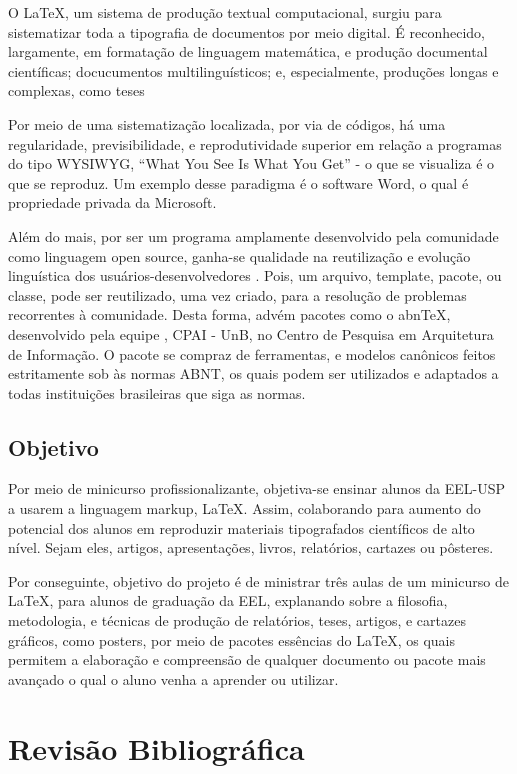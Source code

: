 \documentclass[
12pt,				%
openright,			%
oneside,			%
a4paper,			%
english,			%
french,				%
spanish,			%
brazil,				%
]{abntex2}
\begin{document}
O \LaTeX, um sistema de produção textual computacional, surgiu para
sistematizar toda a tipografia de documentos por meio digital. É
reconhecido, largamente, em formatação de linguagem matemática, e
produção documental científicas; docucumentos multilinguísticos; e,
especialmente, produções longas e complexas, como teses
\cite{ignat2005}

Por meio de uma sistematização localizada, por via de códigos, há uma
regularidade, previsibilidade, e reprodutividade superior em relação a
programas do tipo WYSIWYG, ``What You See Is What You Get'' - o que se
visualiza é o que se reproduz. Um exemplo desse paradigma é o software
Word, o qual é propriedade privada da Microsoft.

Além do mais, por ser um programa amplamente desenvolvido pela
comunidade como linguagem open source, ganha-se qualidade na
reutilização e evolução linguística dos usuários-desenvolvedores
\cite{goossens1994}. Pois, um arquivo, template, pacote, ou classe,
pode ser reutilizado, uma vez criado, para a resolução de problemas
recorrentes à comunidade. Desta forma, advém pacotes como o abnTeX,
desenvolvido pela equipe \abnTeX, CPAI - UnB, no Centro de Pesquisa em
Arquitetura de Informação. O pacote se compraz de ferramentas, e
modelos canônicos feitos estritamente sob às normas ABNT, os quais
podem ser utilizados e adaptados a todas instituições brasileiras que
siga as normas.


\section{Objetivo}

Por meio de minicurso profissionalizante, objetiva-se ensinar alunos da
EEL-USP a usarem a linguagem markup, \LaTeX. Assim, colaborando para
aumento do potencial dos alunos em reproduzir materiais tipografados
científicos de alto nível. Sejam eles, artigos, apresentações, livros,
relatórios, cartazes ou pôsteres.

Por conseguinte, objetivo do projeto é de ministrar três aulas de um minicurso de
\LaTeX, para alunos de graduação da EEL, explanando sobre a filosofia,
metodologia, e técnicas de produção de relatórios, teses, artigos, e
cartazes gráficos, como posters, por meio de pacotes essências do
\LaTeX, os quais permitem a elaboração e compreensão de qualquer
documento ou pacote mais avançado o qual o aluno venha a aprender ou utilizar.

\chapter{Revisão Bibliográfica}
\end{document}
